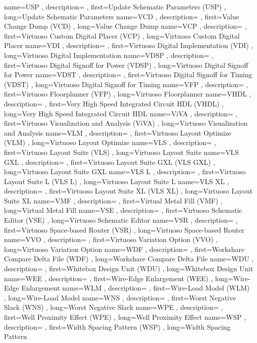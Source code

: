 { name={USP}
, description={}
, first={Update Schematic Parameters (USP)}
, long={Update Schematic Parameters}
}
{ name={VCD}
, description={}
, first={Value Change Dump (VCD)}
, long={Value Change Dump}
}
{ name={VCP}
, description={}
, first={Virtuoso Custom Digital Placer (VCP)}
, long={Virtuoso Custom Digital Placer}
}
{ name={VDI}
, description={}
, first={Virtuoso Digital Implementation (VDI)}
, long={Virtuoso Digital Implementation}
}
{ name={VDSP}
, description={}
, first={Virtuoso Digital Signoff for Power (VDSP)}
, long={Virtuoso Digital Signoff for Power}
}
{ name={VDST}
, description={}
, first={Virtuoso Digital Signoff for Timing (VDST)}
, long={Virtuoso Digital Signoff for Timing}
}
{ name={VFP}
, description={}
, first={Virtuoso Floorplanner (VFP)}
, long={Virtuoso Floorplanner}
}
{ name={VHDL}
, description={}
, first={Very High Speed Integrated Circuit HDL (VHDL)}
, long={Very High Speed Integrated Circuit HDL}
}
{ name={ViVA}
, description={}
, first={Virtuoso Visualization and Analysis (ViVA)}
, long={Virtuoso Visualization and Analysis}
}
{ name={VLM}
, description={}
, first={Virtuoso Layout Optimize (VLM)}
, long={Virtuoso Layout Optimize}
}
{ name={VLS}
, description={}
, first={Virtuoso Layout Suite (VLS)}
, long={Virtuoso Layout Suite}
}
{ name={VLS GXL}
, description={}
, first={Virtuoso Layout Suite GXL (VLS GXL)}
, long={Virtuoso Layout Suite GXL}
}
{ name={VLS L}
, description={}
, first={Virtuoso Layout Suite L (VLS L)}
, long={Virtuoso Layout Suite L}
}
{ name={VLS XL}
, description={}
, first={Virtuoso Layout Suite XL (VLS XL)}
, long={Virtuoso Layout Suite XL}
}
{ name={VMF}
, description={}
, first={Virtual Metal Fill (VMF)}
, long={Virtual Metal Fill}
}
{ name={VSE}
, description={}
, first={Virtuoso Schematic Editor (VSE)}
, long={Virtuoso Schematic Editor}
}
{ name={VSR}
, description={}
, first={Virtuoso Space-based Router (VSR)}
, long={Virtuoso Space-based Router}
}
{ name={VVO}
, description={}
, first={Virtuoso Variation Option (VVO)}
, long={Virtuoso Variation Option}
}
{ name={WDF}
, description={}
, first={Workshare Compare Delta File (WDF)}
, long={Workshare Compare Delta File}
}
{ name={WDU}
, description={}
, first={Whitebox Design Unit (WDU)}
, long={Whitebox Design Unit}
}
{ name={WEE}
, description={}
, first={Wire-Edge Enlargement (WEE)}
, long={Wire-Edge Enlargement}
}
{ name={WLM}
, description={}
, first={Wire-Load Model (WLM)}
, long={Wire-Load Model}
}
{ name={WNS}
, description={}
, first={Worst Negative Slack (WNS)}
, long={Worst Negative Slack}
}
{ name={WPE}
, description={}
, first={Well Proximity Effect (WPE)}
, long={Well Proximity Effect}
}
{ name={WSP}
, description={}
, first={Width Spacing Pattern (WSP)}
, long={Width Spacing Pattern}
}

